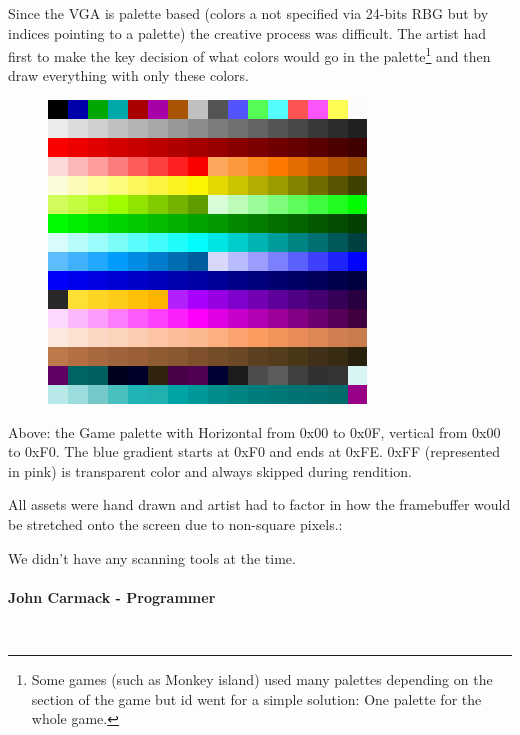 \documentclass[book.tex]{subfiles}
\begin{document}
Since the VGA is palette based (colors a not specified via 24-bits RBG but by indices pointing to a palette) the creative process was difficult. The artist had first to make the key decision of what colors would go in the palette\footnote{Some games (such as Monkey island) used many palettes depending on the section of the game but id went for a simple solution: One palette for the whole game.} and then draw everything with only these colors.\\
\begin{figure}[H]
  \centering
 \includegraphics[width=\textwidth]{imgs/palette.png}
 
\end{figure}
Above: the Game palette with Horizontal from 0x00 to 0x0F, vertical from 0x00 to 0xF0. The blue gradient starts at 0xF0 and ends at 0xFE. 0xFF (represented in pink) is transparent color and always skipped during rendition.\\
\par

All assets were hand drawn and artist had to factor in how the framebuffer would be stretched onto the screen due to non-square pixels.:\\
\par
\begin{fancyquotes}
We didn't have any scanning tools at the time.\\
\\
\textbf{John Carmack - Programmer}
\end{fancyquotes}
\\
\end{document}
